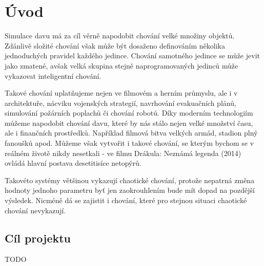 \section{Úvod}
Simulace davu má za cíl věrně napodobit chování velké množiny objektů. Zdánlivě složité chování však může být dosaženo definováním několika jednoduchých pravidel každého jedince. Chování samotného jedince se může jevit jako zmatené, avšak velká skupina stejně naprogramovaných jedinců může vykazovat inteligentní chování. 
\par
Takové chování uplatňujeme nejen ve filmovém a herním průmyslu, ale i v architektuře, nácviku vojenských strategií, navrhování evakuačních plánů, simulování požárních poplachů či chování robotů. \cite{gammaWeb} Díky moderním technologiím můžeme napodobit chování davu, které by nás stálo nejen velké množství času, ale i finančních prostředků. Například filmová bitva velkých armád, stadion plný fanoušků apod. Můžeme však vytvořit i takové chování, se kterým bychom se v reálném životě nikdy nesetkali - ve filmu Drákula: Neznámá legenda (2014) ovládá hlavní postava desetitisíce netopýrů. \cite{DraculaYoutube}
\par 
Takovéto systémy většinou vykazují chaotické chování, protože nepatrná změna hodnoty jednoho parametru byť jen zaokrouhlením bude mít dopad na pozdější výsledek. Nicméně dá se zajistit i chování, které pro stejnou situaci chaotické chování nevykazují. 
\subsection{Cíl projektu}
TODO